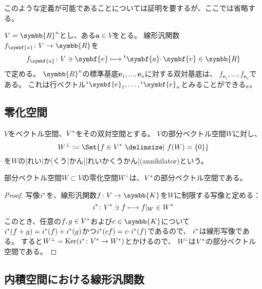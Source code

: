 \documentclass[../sotsu.tex]{subfiles}
\begin{document}
このような定義が可能であることについては証明を要するが、ここでは省略する。

\begin{example}
    $V = \symbb{R}^n$とし、ある$\symbf{a} \in V$をとる。
    線形汎関数$f_{\symbf{a}} \colon V \to \symbb{R}$を
    \[  f_{\symbf{a}} \colon V \ni \symbf{v} \longmapsto \tp{\symbf{a}} \cdotp \symbf{v} \in \symbb{R}  \]
    で定める。
    $\symbb{R}^n$の標準基底$\symbf{e}_1, \dots, \symbf{e}_n$に対する双対基底は、
    $f_{\symbf{e}_1}, \dots, f_{\symbf{e}_n}$である。
    これは行ベクトル$\tp{\symbf{e}_1}, \dots, \tp{\symbf{e}_n}$とみることができる。。
\end{example}



\subsection{零化空間}


\begin{definition}[零化空間]
    $V$をベクトル空間、${V}^*$をその双対空間とする。
    $V$の部分ベクトル空間$W$に対し、
    \begin{equation}
        W^\perp  \coloneq  \Set{  f \in \dual{V}  \given  f(W) = \{ 0 \}  }
    \end{equation}
を$W$の[れい|か|くう|かん][れいかくうかん](annihilator)という\cite[\S 4.2]{saito-lin-2007}。
\end{definition}

\begin{proposition}
    部分ベクトル空間$W \subset V$の零化空間$W^\perp$は、${V}^*$の部分ベクトル空間である。
\end{proposition}

\begin{proof}
    写像${i}^*$を、線形汎関数$f \colon V \to \symbb{K}$を$W$に制限する写像と定める：
    \[  {i}^* \colon {V}^* \ni f \longmapsto f \vert_W \in {W}^*  \]
    このとき、任意の$f, g \in {V}^*$および$c \in \symbb{K}$について
    ${i}^*(f + g) = {i}^*(f) + {i}^*(g)$かつ${i}^*(cf) = c \cdotp {i}^*(f)$であるので、
    ${i}^*$は線形写像である。
    すると$W^\perp = \operatorname{Ker}( {i}^* \colon {V}^* \to {W}^* )$とかけるので、
    $W^\perp$は${V}^*$の部分ベクトル空間である。
\end{proof}



\subsection{内積空間における線形汎関数}
\end{document}
